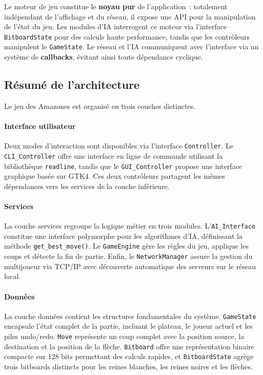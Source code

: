 \documentclass[a4paper]{article}
\begin{document}
Le moteur de jeu constitue le \textbf{noyau pur} de l'application~: totalement indépendant de l'affichage et du réseau, il expose une API pour la manipulation de l'état du jeu. Les modules d'IA interrogent ce moteur via l'interface \texttt{BitboardState} pour des calculs haute performance, tandis que les contrôleurs manipulent le \texttt{GameState}. Le réseau et l'IA communiquent avec l'interface via un système de \textbf{callbacks}, évitant ainsi toute dépendance cyclique.

\subsection{Résumé de l'architecture}

Le jeu des Amazones est organisé en trois couches distinctes.

\paragraph{Interface utilisateur}

Deux modes d'interaction sont disponibles via l'interface \texttt{Controller}. Le \texttt{CLI\_Controller} offre une interface en ligne de commande utilisant la bibliothèque \texttt{readline}, tandis que le \texttt{GUI\_Controller} propose une interface graphique basée sur GTK4. Ces deux contrôleurs partagent les mêmes dépendances vers les services de la couche inférieure.

\paragraph{Services}

La couche services regroupe la logique métier en trois modules. L'\texttt{AI\_Interface} constitue une interface polymorphe pour les algorithmes d'IA, définissant la méthode \texttt{get\_best\_move()}. Le \texttt{GameEngine} gère les règles du jeu, applique les coups et détecte la fin de partie. Enfin, le \texttt{NetworkManager} assure la gestion du multijoueur via TCP/IP avec découverte automatique des serveurs sur le réseau local.

\paragraph{Données}

La couche données contient les structures fondamentales du système. \texttt{GameState} encapsule l'état complet de la partie, incluant le plateau, le joueur actuel et les piles undo/redo. \texttt{Move} représente un coup complet avec la position source, la destination et la position de la flèche. \texttt{Bitboard} offre une représentation binaire compacte sur 128 bits permettant des calculs rapides, et \texttt{BitboardState} agrège trois bitboards distincts pour les reines blanches, les reines noires et les flèches.
\end{document}
